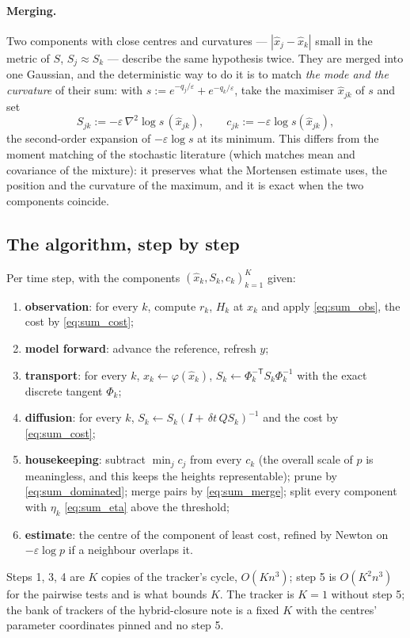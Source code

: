\documentclass[11pt,a4paper]{article}
\newcommand{\xh}{\hat{x}}
\newcommand{\eps}{\varepsilon}
\newcommand{\abs}[1]{\left\lvert #1 \right\rvert}
\newcommand{\grad}{\nabla}
\newcommand{\dt}{\,\delta t}
\theoremstyle{plain}
\theoremstyle{definition}
\theoremstyle{remark}
\begin{document}
\paragraph{Merging.}
Two components with close centres and curvatures --- $\abs{\xh_j-\xh_k}$ small in the metric of $S$, $S_j\approx S_k$ --- describe the same hypothesis twice. They are merged into one Gaussian, and the deterministic way to do it is to match \emph{the mode and the curvature} of their sum: with $s:=e^{-q_j/\eps}+e^{-q_k/\eps}$, take the maximiser $\xh_{jk}$ of $s$ and set
\begin{equation}
  S_{jk} := -\eps\,\grad^2\log s\,(\xh_{jk}), \qquad c_{jk} := -\eps\log s(\xh_{jk}) ,
  \label{eq:sum_merge}
\end{equation}
the second-order expansion of $-\eps\log s$ at its minimum. This differs from the moment matching of the stochastic literature (which matches mean and covariance of the mixture): it preserves what the Mortensen estimate uses, the position and the curvature of the maximum, and it is exact when the two components coincide.

\subsection{The algorithm, step by step}
\label{sec:sum_algo}

Per time step, with the components $(\xh_k,S_k,c_k)_{k=1}^K$ given:
\begin{enumerate}[leftmargin=1.5em,nosep]
  \item \textbf{observation}: for every $k$, compute $r_k$, $H_k$ at $\xh_k$ and apply \eqref{eq:sum_obs}, the cost by \eqref{eq:sum_cost};
  \item \textbf{model forward}: advance the reference, refresh $y$;
  \item \textbf{transport}: for every $k$, $\xh_k\leftarrow\varphi(\xh_k)$, $S_k\leftarrow\Phi_k^{-\mathsf T}S_k\Phi_k^{-1}$ with the exact discrete tangent $\Phi_k$;
  \item \textbf{diffusion}: for every $k$, $S_k\leftarrow S_k(I+\dt\,QS_k)^{-1}$ and the cost by \eqref{eq:sum_cost};
  \item \textbf{housekeeping}: subtract $\min_jc_j$ from every $c_k$ (the overall scale of $p$ is meaningless, and this keeps the heights representable); prune by \eqref{eq:sum_dominated}; merge pairs by \eqref{eq:sum_merge}; split every component with $\eta_k$ \eqref{eq:sum_eta} above the threshold;
  \item \textbf{estimate}: the centre of the component of least cost, refined by Newton on $-\eps\log p$ if a neighbour overlaps it.
\end{enumerate}
Steps 1, 3, 4 are $K$ copies of the tracker's cycle, $O(Kn^3)$; step 5 is $O(K^2n^3)$ for the pairwise tests and is what bounds $K$. The tracker is $K=1$ without step 5; the bank of trackers of the hybrid-closure note is a fixed $K$ with the centres' parameter coordinates pinned and no step 5.
\end{document}
